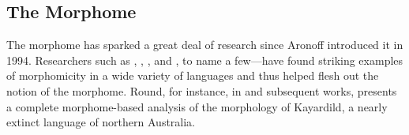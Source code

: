 %

\subsection{The Morphome}
\label{sec:the-morphome}
The morphome has sparked a 
great deal of research since Aronoff introduced it in 1994. Researchers
such as \cite{maiden:2005, maiden:md:2016}, \cite{round:2009, round:2011, 
round:2012, round:2015, round:md:2016}, \cite{oneill:2014b,oneill:2018}, and \cite{bonami:2008, bonami:2010}, to name 
a few---have found striking examples of morphomicity in a wide variety of 
languages and thus helped flesh out the notion of the morphome.
Round, for instance, in \cite{round:2009} and subsequent works, 
presents a complete morphome-based analysis of the morphology of 
Kayardild, a nearly extinct language of northern Australia. 
 
